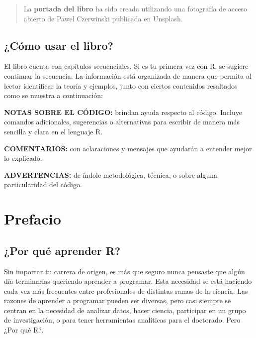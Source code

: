 \documentclass[
]{article}
\theoremstyle{definition}
\theoremstyle{definition}
\theoremstyle{definition}
\theoremstyle{definition}
\theoremstyle{remark}
\begin{document}
\begin{quote}
La \textbf{portada del libro} ha sido creada utilizando una fotografía de acceso abierto de Pawel Czerwinski publicada en Unsplash.
\end{quote}

\hypertarget{cuxf3mo-usar-el-libro}{%
\subsection*{¿Cómo usar el libro?}\label{cuxf3mo-usar-el-libro}}

El libro cuenta con capítulos secuenciales. Si es tu primera vez con R, se sugiere continuar la secuencia. La información está organizada de manera que permita al lector identificar la teoría y ejemplos, junto con ciertos contenidos resaltados como se muestra a continuación:

\begin{rmdnote}
\textbf{NOTAS SOBRE EL CÓDIGO:} brindan ayuda respecto al código. Incluye comandos adicionales, sugerencias o alternativas para escribir de manera más sencilla y clara en el lenguaje R.
\end{rmdnote}

\begin{rmdtip}
\textbf{COMENTARIOS:} con aclaraciones y mensajes que ayudarán a entender mejor lo explicado.
\end{rmdtip}

\begin{rmdwarning}
\textbf{ADVERTENCIAS:} de índole metodológica, técnica, o sobre alguna particularidad del código.
\end{rmdwarning}

\hypertarget{prefacio}{%
\section*{\texorpdfstring{\textbf{Prefacio}}{Prefacio}}\label{prefacio}}

\hypertarget{por-quuxe9-aprender-r}{%
\subsection*{¿Por qué aprender R?}\label{por-quuxe9-aprender-r}}

Sin importar tu carrera de origen, es más que seguro nunca pensaste que algún día terminarías queriendo aprender a programar. Esta necesidad se está haciendo cada vez más frecuentes entre profesionales de distintas ramas de la ciencia. Las razones de aprender a programar pueden ser diversas, pero casi siempre se centran en la necesidad de analizar datos, hacer ciencia, participar en un grupo de investigación, o para tener herramientas analíticas para el doctorado. Pero ¿Por qué R?.
\end{document}
